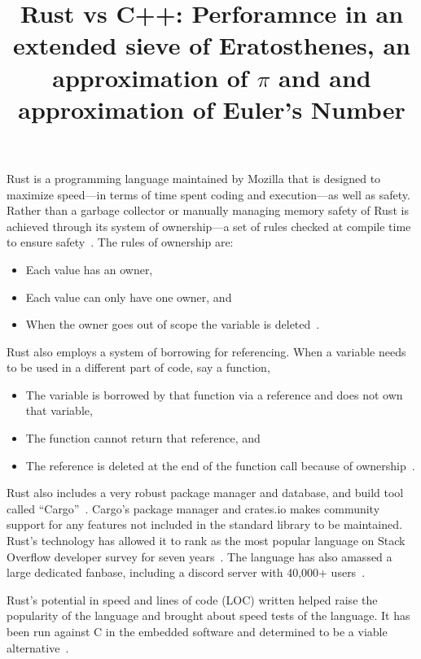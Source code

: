 \documentclass[10pt]{IEEEtran}
\begin{document}
\title{Rust vs C++: Perforamnce in an extended sieve of Eratosthenes, an approximation of $\pi$ and and approximation of Euler's Number}
\author{
\IEEEauthorblockA{} }
\date{}

\maketitle


Rust is a programming language maintained by Mozilla that is designed to maximize speed---in terms of time spent coding and 
execution---as well as safety. Rather than a garbage collector or manually managing memory safety of Rust is achieved 
through its system of ownership---a set of rules checked at compile time to ensure safety~\cite{rust2023}. The rules of ownership are:
\begin{itemize}
    \item Each value has an owner,
    \item Each value can only have one owner, and
    \item When the owner goes out of scope the variable is deleted~\cite{rust2023}.
\end{itemize}
Rust also employs a system of borrowing for referencing. When a variable needs to be used in a different part of code, say a function, 
\begin{itemize}
    \item The variable is borrowed by that function via a reference and does not own that variable,
    \item The function cannot return that reference, and
    \item The reference is deleted at the end of the function call because of ownership~\cite{rust2023}.
\end{itemize}
Rust also includes a very robust package manager and database, and build tool called “Cargo”~\cite{cargobook}. 
Cargo's package manager and crates.io makes community support for any features not included in the standard library to be maintained.
Rust's technology has allowed it to rank as the most popular language on Stack Overflow developer survey for seven years~\cite{stackoverflow2022}. 
The language has also amassed a large dedicated fanbase, including a discord server with 40,000+ users~\cite{discord}.
\par
Rust's potential in speed and lines of code (LOC) written helped raise the popularity of the language and brought about speed tests of the language. 
It has been run against C in the embedded software and determined to be a viable alternative~\cite{borgsmuller2021rust}. 
\end{document}
